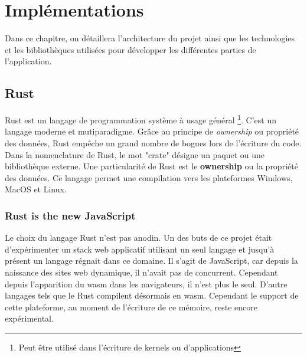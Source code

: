 \chapter{Implémentations}

Dans ce chapitre, on détaillera l'architecture du projet 
ainsi que les technologies et les bibliothèques utilisées
pour développer les différentes parties de l'application.


\section{Rust}

Rust est un langage de programmation système à usage général \footnote{Peut être
utilisé dans l'écriture de kernels ou d'applications}. C'est un langage moderne
et mutiparadigme.
Grâce au principe de \textit{ownership} ou propriété des données, Rust empêche un grand nombre de
bogues lors de l'écriture du code. 
Dans la nomenclature de Rust, le mot "crate" désigne un paquet ou une bibliothèque
externe.
Une particularité de Rust est le \textbf{ownership} ou la propriété des données.
Ce langage permet une compilation vers les plateformes Windows, MacOS et Linux.

\subsection{Rust is the new JavaScript} 

Le choix du langage Rust n'est pas anodin.
Un des buts de ce projet était d'expérimenter un stack
web applicatif utilisant un seul langage et jusqu'à présent un langage régnait dans ce domaine.
Il s'agit de JavaScript, car depuis la naissance des sites web dynamique, il
n'avait pas de concurrent.
Cependant depuis l'apparition du \gls{wasm} dans les navigateurs, il n'est plus
le seul. D'autre langages tels que le Rust compilent désormais en \gls{wasm}.
Cependant le support de cette plateforme, au moment de l'écriture de ce mémoire,
reste encore expérimental.

